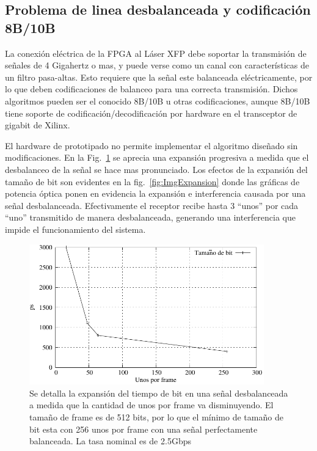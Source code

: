 \subsection{Problema de linea desbalanceada y codificación 8B/10B}
La conexión eléctrica de la FPGA al Láser XFP debe soportar la transmisión de señales de 4 Gigahertz o mas, y puede verse como un canal con características de un filtro pasa-altas. Esto requiere que la señal este balanceada eléctricamente, por lo que deben codificaciones de balanceo para una correcta transmisión. Dichos algoritmos pueden ser el conocido 8B/10B u otras codificaciones, aunque 8B/10B tiene soporte de codificación/decodificación por hardware en el transceptor de gigabit de Xilinx.

El hardware de prototipado no permite implementar el algoritmo diseñado sin modificaciones. En la Fig.~\ref{fig:expansionbit} se aprecia una expansión progresiva a medida que el desbalanceo de la señal se hace mas pronunciado. Los efectos de la expansión del tamaño de bit son evidentes en la fig.~\ref{fig:ImgExpansion} donde las gráficas de potencia óptica ponen en evidencia la expansión e interferencia causada por una señal desbalanceada.
Efectivamente el receptor recibe hasta 3 ``unos'' por cada ``uno'' transmitido de manera desbalanceada, generando una interferencia que impide el funcionamiento del sistema.

\begin{figure}[t]
  \centering
    \includegraphics[width=4in]{graphs/expansionbit.pdf}
\caption {Se detalla la expansión del tiempo de bit en una señal desbalanceada a medida que la cantidad de unos por frame va disminuyendo. El tamaño de frame es de 512 bits, por lo que el mínimo de tamaño de bit esta con 256 unos por frame con una señal perfectamente balanceada. La tasa nominal es de 2.5Gbps}
\label{fig:expansionbit}
\end{figure}

